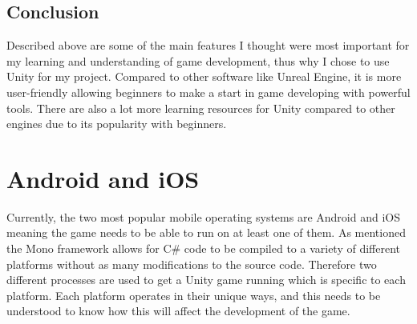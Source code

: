 \documentclass[a4paper]{report}
\begin{document}
\subsection{Conclusion}
Described above are some of the main features I thought were most important for my learning and understanding of game development, thus why I chose to use Unity for my project. Compared to other software like Unreal Engine, it is more user-friendly allowing beginners to make a start in game developing with powerful tools. There are also a lot more learning resources for Unity compared to other engines due to its popularity with beginners.

\section{Android and iOS}
Currently, the two most popular mobile operating systems are Android and iOS meaning the game needs to be able to run on at least one of them. As mentioned the Mono framework allows for C\# code to be compiled to a variety of different platforms without as many modifications to the source code. Therefore two different processes are used to get a Unity game running which is specific to each platform. Each platform operates in their unique ways, and this needs to be understood to know how this will affect the development of the game.
\end{document}

